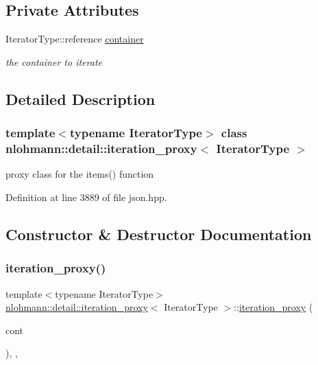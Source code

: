 \subsection*{Private Attributes}
\begin{DoxyCompactItemize}
\item 
Iterator\+Type\+::reference \hyperlink{classnlohmann_1_1detail_1_1iteration__proxy_a88c0532ba4a5de1d527b18053b24fd19}{container}
\begin{DoxyCompactList}\small\item\em the container to iterate \end{DoxyCompactList}\end{DoxyCompactItemize}


\subsection{Detailed Description}
\subsubsection*{template$<$typename Iterator\+Type$>$\newline
class nlohmann\+::detail\+::iteration\+\_\+proxy$<$ Iterator\+Type $>$}

proxy class for the items() function 

Definition at line 3889 of file json.\+hpp.



\subsection{Constructor \& Destructor Documentation}
\mbox{\label{classnlohmann_1_1detail_1_1iteration__proxy_afe257e972e3b4658ef2e355f7389d4a5}} 
\subsubsection{\texorpdfstring{iteration\+\_\+proxy()}{iteration\_proxy()}}
{\footnotesize\ttfamily template$<$typename Iterator\+Type$>$ \\
\hyperlink{classnlohmann_1_1detail_1_1iteration__proxy}{nlohmann\+::detail\+::iteration\+\_\+proxy}$<$ Iterator\+Type $>$\+::\hyperlink{classnlohmann_1_1detail_1_1iteration__proxy}{iteration\+\_\+proxy} (\begin{DoxyParamCaption}\item[{typename Iterator\+Type\+::reference}]{cont }\end{DoxyParamCaption})\hspace{0.3cm}{\ttfamily [inline]}, {\ttfamily [explicit]}, {\ttfamily [noexcept]}}



